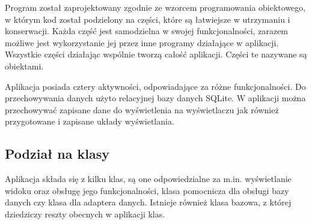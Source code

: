 \documentclass[a4paper,12pt, twoside]{article}
\begin{document}
    	Program został zaprojektowany zgodnie ze wzorcem programowania obiektowego\cite{oop}, w którym kod został podzielony na części, które są łatwiejsze w utrzymaniu i konserwacji. Każda część jest samodzielna w swojej funkcjonalności, zarazem możliwe jest wykorzystanie jej przez inne programy działające w aplikacji. Wszystkie części działając wspólnie tworzą całość aplikacji. Części te nazywane są obiektami. 
    	
    	Aplikacja posiada cztery aktywności, odpowiadające za różne funkcjonalności. Do przechowywania danych użyto relacyjnej bazy danych SQLite. W aplikacji można przechowywać zapisane dane do wyświetlenia na wyświetlaczu jak również przygotowane i zapisane układy wyświetlania.
    	
    	\subsection{Podział na klasy}
    	Aplikacja składa się z kilku klas, są one odpowiedzialne za m.in. wyświetlanie widoku oraz obsługę jego funkcjonalności, klasa pomocnicza dla obsługi bazy danych czy klasa dla adaptera danych. Istnieje również klasa bazowa, z której dziedziczy reszty obecnych w aplikacji klas.
    	
\end{document}
